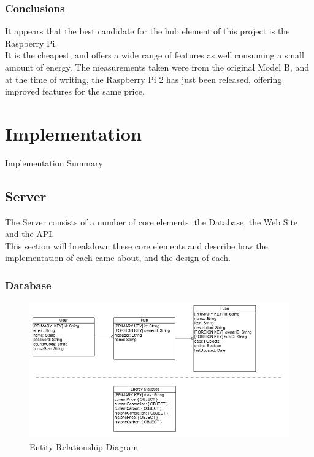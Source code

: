 \documentclass[draft,preprint,12pt,3p]{elsarticle}
\begin{document}
\subsubsection{Conclusions}
It appears that the best candidate for the hub element of this project is the Raspberry Pi.\\
It is the cheapest, and offers a wide range of features as well consuming a small amount of energy. The measurements taken were from the original Model B, and at the time of writing, the Raspberry Pi 2 has just been released, offering improved features for the same price.


 \clearpage
\section{Implementation}
Implementation Summary

\subsection{Server}
The Server consists of a number of core elements: the Database, the Web Site and the API.\\
This section will breakdown these core elements and describe how the implementation of each came about, and the design of each.

\subsubsection{Database}
\begin{figure}[H]
    \centering
    \includegraphics[width=\columnwidth]{diagrams/erd}
    \caption {Entity Relationship Diagram}
\end{figure}
\end{document}
